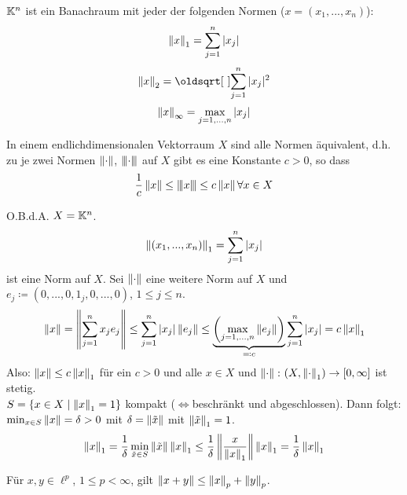 \begin{beispiel*}
$ \mathbb{K}^n $ ist ein Banachraum mit jeder der folgenden Normen ($ x=(x_1,...,x_n) $):
\[ \left\|x\right\|_1=\sum_{j=1}^{n} |x_j| \]
\[ \norm{x}_2=\sqrt{\sum_{j=1}^{n}|x_j|^2} \]
\[ \left\|x\right\|_\infty=\max_{j=1,...,n}|x_j| \]
\end{beispiel*}
\begin{proposition}
In einem endlichdimensionalen Vektorraum $ X $ sind alle Normen \"aquivalent, d.h. zu je zwei Normen $ \left\|\cdot\right\| $, $ {\left\vert\kern-0.25ex\left\vert\kern-0.25ex\left\vert \cdot \right\vert\kern-0.25ex\right\vert\kern-0.25ex\right\vert}$ auf $ X $ gibt es eine Konstante $ c>0 $, so dass
\[ \frac{1}{c}\left\|x\right\|\leq{\left\vert\kern-0.25ex\left\vert\kern-0.25ex\left\vert x \right\vert\kern-0.25ex\right\vert\kern-0.25ex\right\vert}\leq c\left\|x\right\|\forall x\in X \]
\end{proposition}
\newpage
\begin{beweis}
O.B.d.A. $ X=\mathbb{K}^n $.
\[ \left\|(x_1,...,x_n)\right\|_1=\sum_{j=1}^{n}|x_j| \]
ist eine Norm auf $ X $. Sei $ \left\|\cdot\right\| $ eine weitere Norm auf $ X $ und $ e_j\coloneqq (0,...,0,1_j,0,...,0) $, $ 1\leq j\leq n $.
\[ \left\|x\right\|=\left\|\sum_{j=1}^{n}x_je_j\right\|\leq\sum_{j=1}^{n}|x_j|\left\|e_j\right\|\leq\underbrace{\left(\max_{j=1,...,n}\left\|e_j\right\|\right)}_{\eqqcolon c}\sum_{j=1}^{n}|x_j|=c\left\|x\right\|_1 \]
Also: $ \left\|x\right\|\leq c\left\|x\right\|_1 $ f\"ur ein $ c>0 $ und alle $ x\in X $ und $ \left\|\cdot\right\|\colon (X,\left\|\cdot\right\|_1)\rightarrow[0,\infty] $ ist stetig.\\
$ S=\lbrace x\in X\mid\left\|x\right\|_1=1\rbrace $ kompakt ($ \Leftrightarrow $beschr\"ankt und abgeschlossen). Dann folgt: $ \min_{x\in S}\left\|x\right\|=\delta>0 $ mit $ \delta=\left\|\tilde{x}\right\| $ mit $ \left\|\tilde{x}\right\|_1=1 $.
\[ \left\|x\right\|_1=\frac{1}{\delta}\min_{\tilde{x}\in S}\left\|\tilde{x}\right\|\left\|x\right\|_1\leq\frac{1}{\delta}\left\|\frac{x}{\left\|x\right\|_1}\right\|\left\|x\right\|_1=\frac{1}{\delta}\left\|x\right\|_1 \]
\end{beweis}
\begin{satz}
F\"ur $ x,y\in \ell^p $, $ 1\leq p<\infty $, gilt $ \left\|x+y\right\|\leq\left\|x\right\|_p+\left\|y\right\|_p $.
\end{satz}
